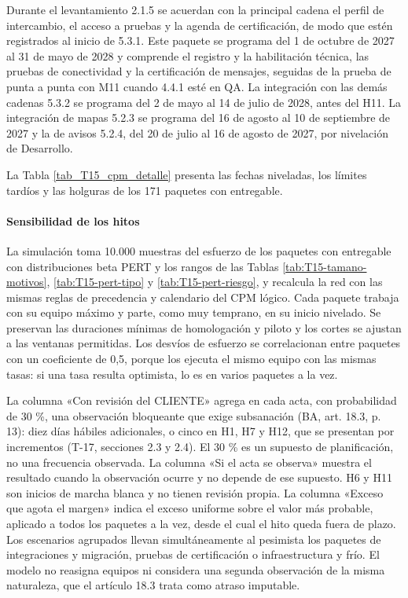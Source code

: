 Durante el levantamiento 2.1.5 se acuerdan con la principal cadena el perfil de intercambio, el acceso a pruebas y la agenda de certificación, de modo que estén registrados al inicio de 5.3.1. Este paquete se programa del 1 de octubre de 2027 al 31 de mayo de 2028 y comprende el registro y la habilitación técnica, las pruebas de conectividad y la certificación de mensajes, seguidas de la prueba de punta a punta con M11 cuando 4.4.1 esté en QA. La integración con las demás cadenas 5.3.2 se programa del 2 de mayo al 14 de julio de 2028, antes del H11. La integración de mapas 5.2.3 se programa del 16 de agosto al 10 de septiembre de 2027 y la de avisos 5.2.4, del 20 de julio al 16 de agosto de 2027, por nivelación de Desarrollo.

La Tabla \ref{tab_T15_cpm_detalle} presenta las fechas niveladas, los límites tardíos y las holguras de los 171 paquetes con entregable.


\paragraph{Sensibilidad de los hitos}
La simulación toma 10.000 muestras del esfuerzo de los paquetes con entregable con distribuciones beta PERT y los rangos de las Tablas \ref{tab:T15-tamano-motivos}, \ref{tab:T15-pert-tipo} y \ref{tab:T15-pert-riesgo}, y recalcula la red con las mismas reglas de precedencia y calendario del CPM lógico. Cada paquete trabaja con su equipo máximo y parte, como muy temprano, en su inicio nivelado. Se preservan las duraciones mínimas de homologación y piloto y los cortes se ajustan a las ventanas permitidas. Los desvíos de esfuerzo se correlacionan entre paquetes con un coeficiente de 0,5, porque los ejecuta el mismo equipo con las mismas tasas: si una tasa resulta optimista, lo es en varios paquetes a la vez.

La columna «Con revisión del CLIENTE» agrega en cada acta, con probabilidad de 30 \%, una observación bloqueante que exige subsanación (BA, art. 18.3, p. 13): diez días hábiles adicionales, o cinco en H1, H7 y H12, que se presentan por incrementos (T-17, secciones 2.3 y 2.4). El 30 \% es un supuesto de planificación, no una frecuencia observada. La columna «Si el acta se observa» muestra el resultado cuando la observación ocurre y no depende de ese supuesto. H6 y H11 son inicios de marcha blanca y no tienen revisión propia. La columna «Exceso que agota el margen» indica el exceso uniforme sobre el valor más probable, aplicado a todos los paquetes a la vez, desde el cual el hito queda fuera de plazo. Los escenarios agrupados llevan simultáneamente al pesimista los paquetes de integraciones y migración, pruebas de certificación o infraestructura y frío. El modelo no reasigna equipos ni considera una segunda observación de la misma naturaleza, que el artículo 18.3 trata como atraso imputable.

